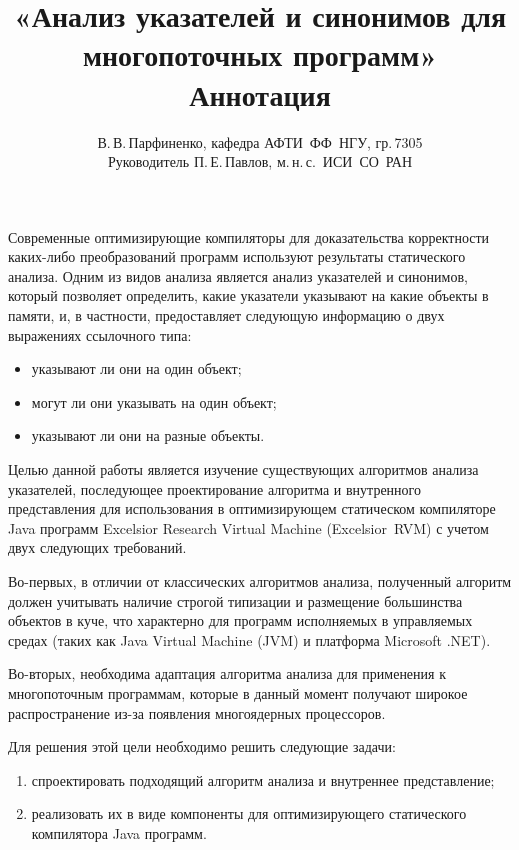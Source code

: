 \documentclass[10pt]{article}
\title{
  «Анализ указателей и синонимов для многопоточных программ»\\
  Аннотация
}
\author{
  В.\,В.\,Парфиненко, кафедра АФТИ~ФФ~НГУ, гр.\,7305\\
  Руководитель П.\,Е.\,Павлов, м.\,н.\,с.~ИСИ~СО~РАН
}
\begin{document}
  \maketitle

  \thispagestyle{empty}

    Современные оптимизирующие компиляторы для доказательства корректности
    каких-либо преобразований программ используют результаты
    статического анализа.
    Одним из видов анализа является анализ указателей и синонимов, который
    позволяет определить, какие указатели указывают на какие объекты в памяти,
    и, в частности, предоставляет следующую информацию о двух выражениях
    ссылочного типа:
    \begin{itemize}
      \item указывают ли они на один объект;
      \item могут ли они указывать на один объект;
      \item указывают ли они на разные объекты.
    \end{itemize}

    Целью данной работы является изучение существующих алгоритмов анализа
    указателей, последующее проектирование алгоритма и
    внутренного представления для использования в оптимизирующем
    статическом компиляторе Java программ
    Excelsior Research Virtual Machine (Excelsior~RVM)
    с учетом двух следующих требований.

    Во-первых,
    в отличии от классических алгоритмов анализа, полученный алгоритм должен
    учитывать наличие строгой типизации и размещение большинства объектов
    в куче, что характерно для программ исполняемых в управляемых средах
    (таких как Java Virtual Machine (JVM) и платформа Microsoft .NET).

    Во-вторых, необходима адаптация алгоритма анализа
    для применения к многопоточным программам,
    которые в данный момент получают широкое распространение
    из-за появления многоядерных процессоров.

    Для решения этой цели необходимо решить следующие задачи:
    \begin{enumerate}
      \item спроектировать подходящий алгоритм анализа и внутреннее
            представление;
      \item реализовать их в виде компоненты для оптимизирующего статического
            компилятора Java программ.
    \end{enumerate}
\end{document}
